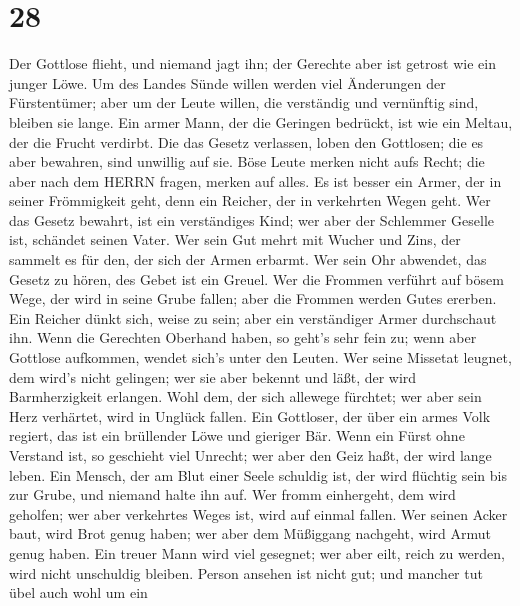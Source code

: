 \hypertarget{section-27}{%
\section{28}\label{section-27}}

 Der Gottlose flieht, und niemand jagt ihn; der Gerechte
aber ist getrost wie ein junger Löwe.  Um des Landes Sünde
willen werden viel Änderungen der Fürstentümer; aber um der Leute
willen, die verständig und vernünftig sind, bleiben sie lange.
 Ein armer Mann, der die Geringen bedrückt, ist wie ein
Meltau, der die Frucht verdirbt.  Die das Gesetz verlassen,
loben den Gottlosen; die es aber bewahren, sind unwillig auf sie.
 Böse Leute merken nicht aufs Recht; die aber nach dem HERRN
fragen, merken auf alles.  Es ist besser ein Armer, der in
seiner Frömmigkeit geht, denn ein Reicher, der in verkehrten Wegen geht.
 Wer das Gesetz bewahrt, ist ein verständiges Kind; wer aber
der Schlemmer Geselle ist, schändet seinen Vater.  Wer sein
Gut mehrt mit Wucher und Zins, der sammelt es für den, der sich der
Armen erbarmt.  Wer sein Ohr abwendet, das Gesetz zu hören,
des Gebet ist ein Greuel.  Wer die Frommen verführt auf
bösem Wege, der wird in seine Grube fallen; aber die Frommen werden
Gutes ererben.  Ein Reicher dünkt sich, weise zu sein; aber
ein verständiger Armer durchschaut ihn.  Wenn die Gerechten
Oberhand haben, so geht's sehr fein zu; wenn aber Gottlose aufkommen,
wendet sich's unter den Leuten.  Wer seine Missetat
leugnet, dem wird's nicht gelingen; wer sie aber bekennt und läßt, der
wird Barmherzigkeit erlangen.  Wohl dem, der sich allewege
fürchtet; wer aber sein Herz verhärtet, wird in Unglück fallen.
 Ein Gottloser, der über ein armes Volk regiert, das ist
ein brüllender Löwe und gieriger Bär.  Wenn ein Fürst ohne
Verstand ist, so geschieht viel Unrecht; wer aber den Geiz haßt, der
wird lange leben.  Ein Mensch, der am Blut einer Seele
schuldig ist, der wird flüchtig sein bis zur Grube, und niemand halte
ihn auf.  Wer fromm einhergeht, dem wird geholfen; wer aber
verkehrtes Weges ist, wird auf einmal fallen.  Wer seinen
Acker baut, wird Brot genug haben; wer aber dem Müßiggang nachgeht, wird
Armut genug haben.  Ein treuer Mann wird viel gesegnet; wer
aber eilt, reich zu werden, wird nicht unschuldig bleiben. 
Person ansehen ist nicht gut; und mancher tut übel auch wohl um ein
